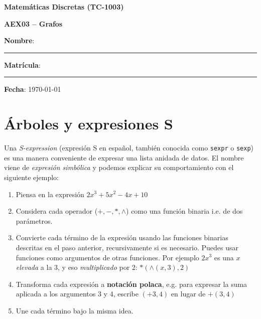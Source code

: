\documentclass[spanish, 10pt]{article}
\begin{document}
\begin{center}
	{\Large \textbf{Matemáticas Discretas (TC-1003)}}
	
	\bigskip
	{\large \textbf{AEX03 -- Grafos}}
\end{center}

\bigskip
{\large \textbf{Nombre}: \rule{13.7 cm}{0.4mm}}



\bigskip
{\large \textbf{Matrícula}: \rule{5 cm}{0.4mm}} \hfill {\large \textbf{Fecha}: \today}

\bigskip


\section{Árboles y expresiones S}

Una \textit{S-expression} (expresión S en español, también conocida como \texttt{sexpr} o \texttt{sexp}) es una manera conveniente de expresar una lista anidada de datos.
El nombre viene de \textit{expresión simbólica} y podemos explicar su comportamiento con el siguiente ejemplo:

\begin{enumerate}
	\item Piensa en la expresión $2x^3 + 5x^2 - 4x + 10$
	\item Considera cada operador ($+, -, *, \wedge$) como una función binaria i.e. de dos parámetros. 
	\item Convierte cada término de la expresión usando las funciones binarias descritas en el paso anterior, recursivamente si es necesario.
		  Puedes usar funciones como argumentos de otras funciones.
		  Por ejemplo $2x^3$ es una $x$ \textsl{elevada} a la 3, y eso \textsl{multiplicado} por 2: $*(\wedge (x, 3), 2)$
	\item Transforma cada expresión a \textbf{notación polaca}, e.g. para expresar la suma aplicada a los argumentos 3 y 4, escribe $(+ 3,  4)$ en lugar de $+(3, 4)$
	\item Une cada término bajo la misma idea.
\end{enumerate}
\end{document}
